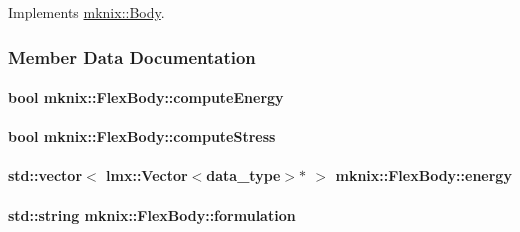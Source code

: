 Implements \hyperlink{classmknix_1_1_body_ada574d09e98568156185eb7eef398c8f}{mknix\-::\-Body}.



\subsubsection{Member Data Documentation}
\hypertarget{classmknix_1_1_flex_body_a653efdbfbf4f6ec147407a1c7ffb3779}{
\paragraph[{compute\-Energy}]{\setlength{\rightskip}{0pt plus 5cm}bool mknix\-::\-Flex\-Body\-::compute\-Energy\hspace{0.3cm}{\ttfamily [protected]}}}\label{classmknix_1_1_flex_body_a653efdbfbf4f6ec147407a1c7ffb3779}
\hypertarget{classmknix_1_1_flex_body_aaacb11b0809c01edca2c7ef4ea41de7a}{
\paragraph[{compute\-Stress}]{\setlength{\rightskip}{0pt plus 5cm}bool mknix\-::\-Flex\-Body\-::compute\-Stress\hspace{0.3cm}{\ttfamily [protected]}}}\label{classmknix_1_1_flex_body_aaacb11b0809c01edca2c7ef4ea41de7a}
\hypertarget{classmknix_1_1_flex_body_a9152c5c0047a854fd4875082e6ca191e}{
\paragraph[{energy}]{\setlength{\rightskip}{0pt plus 5cm}std\-::vector$<$ lmx\-::\-Vector$<${\bf data\-\_\-type}$>$$\ast$ $>$ mknix\-::\-Flex\-Body\-::energy\hspace{0.3cm}{\ttfamily [protected]}}}\label{classmknix_1_1_flex_body_a9152c5c0047a854fd4875082e6ca191e}
\hypertarget{classmknix_1_1_flex_body_acb6f1ed2a9f207ceb39d485aabc2fbcf}{
\paragraph[{formulation}]{\setlength{\rightskip}{0pt plus 5cm}std\-::string mknix\-::\-Flex\-Body\-::formulation\hspace{0.3cm}{\ttfamily [protected]}}}\label{classmknix_1_1_flex_body_acb6f1ed2a9f207ceb39d485aabc2fbcf}
